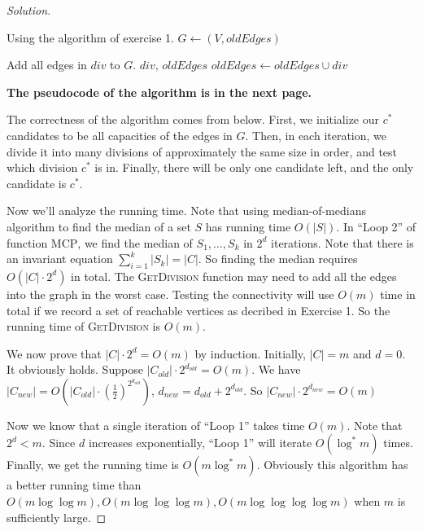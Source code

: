 \begin{proof}[Solution]
\begin{algorithm}
\begin{algorithmic}
                \bigskip
                
                 \Comment Using the algorithm of exercise 1.
                    \State $G\gets (V, oldEdges)$
                    
                        \State Add all edges in $div$ to $G$.
                            \State \Return $div$, $oldEdges$
                        \Else
                            \State $oldEdges \gets oldEdges \cup div$
                        \EndIf
                    \EndFor
                \EndFunction
            \end{algorithmic}
        \end{algorithm}
    
        {\bf The pseudocode of the algorithm is in the next page.}
    
        The correctness of the algorithm comes from below.
        First, we initialize our $c^*$ candidates to be all capacities of the edges in $G$.
        Then, in each iteration, we divide it into many divisions of approximately the same size in order, and test which division $c^*$ is in.
        Finally, there will be only one candidate left, and the only candidate is $c^*$.

        Now we'll analyze the running time.
        Note that using median-of-medians algorithm to find the median of a set $S$ has running time $O(|S|)$.
        In ``Loop 2'' of function \textsc{MCP}, we find the median of $S_1,\ldots,S_k$ in $2^d$ iterations.
        Note that there is an invariant equation $\sum_{i=1}^{k}|S_k|=|C|$.
        So finding the median requires $O(|C|\cdot 2^{d})$ in total.
        The \textsc{GetDivision} function may need to add all the edges into the graph in the worst case.
        Testing the connectivity will use $O(m)$ time in total if we record a set of reachable vertices as decribed in Exercise 1.
        So the running time of \textsc{GetDivision} is $O(m)$.

        We now prove that $|C|\cdot 2^{d}=O(m)$ by induction.
        Initially, $|C|=m$ and $d=0$.
        It obviously holds.
        Suppose $|C_{old}|\cdot 2^{d_{old}}=O(m)$.
        We have $|C_{new}|=O(|C_{old}|\cdot (\frac{1}{2})^{2^{d_{old}}})$,
        $d_{new}=d_{old}+2^{d_{old}}$.
        So  $|C_{new}|\cdot 2^{d_{new}}=O(m)$

        Now we know that a single iteration of ``Loop 1'' takes time $O(m)$.
        Note that $2^{d}<m$.
        Since $d$ increases exponentially, ``Loop 1'' will iterate $O(\log^*m)$ times.
        Finally, we get the running time is $O(m\log^*m)$.
        Obviously this algorithm has a better running time than $O(m\log\log m),O(m\log\log\log m),O(m\log\log\log\log m)$ when $m$ is sufficiently large.
    \end{proof}

